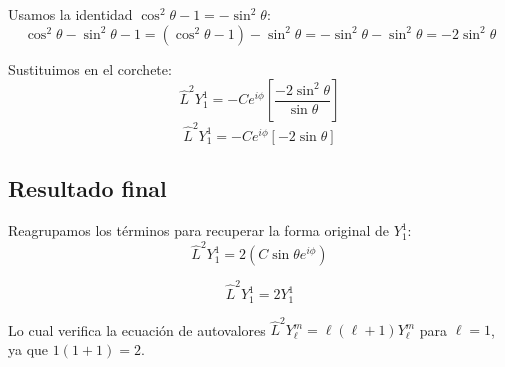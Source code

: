 \documentclass[a4paper]{article}
\begin{document}
Usamos la identidad $\cos^2\theta - 1 = -\sin^2\theta$:
$$ \cos^2\theta - \sin^2\theta - 1 = (\cos^2\theta - 1) - \sin^2\theta = -\sin^2\theta - \sin^2\theta = -2\sin^2\theta $$

Sustituimos en el corchete:
$$ \hat{L}^2 Y_1^1 = - C e^{i\phi} \left[ \frac{-2\sin^2\theta}{\sin\theta} \right] $$
$$ \hat{L}^2 Y_1^1 = - C e^{i\phi} \left[ -2\sin\theta \right] $$

\subsection{Resultado final}

Reagrupamos los términos para recuperar la forma original de $Y_1^1$:
$$ \hat{L}^2 Y_1^1 = 2 \left( C \sin\theta e^{i\phi} \right) $$

$$ \hat{L}^2 Y_1^1 = 2 Y_1^1 $$

Lo cual verifica la ecuación de autovalores $\hat{L}^2 Y_\ell^m = \ell(\ell+1) Y_\ell^m$ para $\ell=1$, ya que $1(1+1) = 2$.

 
\end{document}
